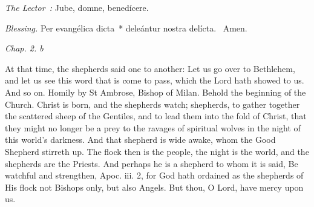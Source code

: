 {  {
    \medskip

    \emph{The Lector~:} Jube, domne, benedícere.

    \emph{Blessing.} Per evangélica dicta~* deleántur nostra delícta. \Rbar{}~Amen.
  }

  \bigskip{}
  {


  }

  {
    \hspace{10ex}{Lesson VI.}\hfill\emph{Chap. 2. b}\hspace{10ex}

    \begin{parcolumns}[rulebetween,colwidths={1=.51\linewidth}]{2}
    {At that time, the shepherds said one to another: Let us go over to Bethlehem, and let us see this word that is come to pass, which the Lord hath showed to us. And so on.
Homily by St Ambrose, Bishop of Milan.
Behold the beginning of the Church. Christ is born, and the shepherds watch; shepherds, to gather together the scattered sheep of the Gentiles, and to lead them into the fold of Christ, that they might no longer be a prey to the ravages of spiritual wolves in the night of this world's darkness. And that shepherd is wide awake, whom the Good Shepherd stirreth up. The flock then is the people, the night is the world, and the shepherds are the Priests. And perhaps he is a shepherd to whom it is said, Be watchful and strengthen, Apoc. iii. 2, for God hath ordained as the shepherds of His flock not Bishops only, but also Angels.
      But thou, O Lord, have mercy upon us.}
    \end{parcolumns}

}}
